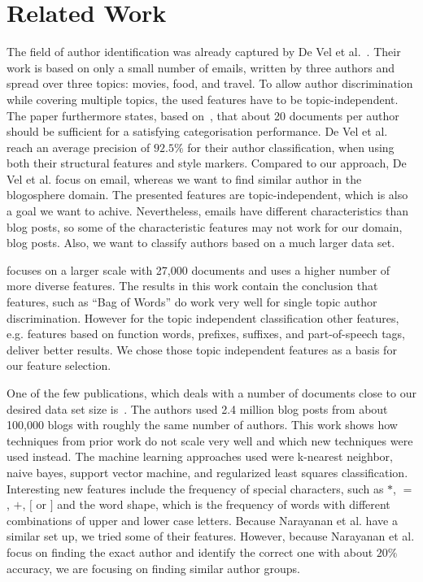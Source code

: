 
\section{Related Work}
\label{sec:related}

The field of author identification was already captured by De Vel et al.~\cite{de2001mining}.
Their work is based on only a small number of emails, written by three authors and spread over three topics: movies, food, and travel.
To allow author discrimination while covering multiple topics, the used features have to be topic-independent.
The paper furthermore states, based on~\cite{corney2001identifying}, that about 20 documents per author should be sufficient for a satisfying categorisation performance.
De Vel et al. reach an average precision of $92.5\%$ for their author classification, when using both their structural features and style markers.
Compared to our approach, De Vel et al. focus on email, whereas we want to find similar author in the blogosphere domain.
The presented features are topic-independent, which is also a goal we want to achive.
Nevertheless, emails have different characteristics than blog posts, so some of the characteristic features may not work for our domain, blog posts.
Also, we want to classify authors based on a much larger data set.


\cite{madigan2005author} focuses on a larger scale with 27,000 documents and uses a higher number of more diverse features.
The results in this work contain the conclusion that features, such as ``Bag of Words'' do work very well for single topic author discrimination.
However for the topic independent classification other features, e.g. features based on function words, prefixes, suffixes, and part-of-speech tags, deliver better results.
We chose those topic independent features as a basis for our feature selection.


One of the few publications, which deals with a number of documents close to our desired data set size is~\cite{narayanan2012feasibility}.
The authors used 2.4 million blog posts from about 100,000 blogs with roughly the same number of authors.
This work shows how techniques from prior work do not scale very well and which new techniques were used instead.
The machine learning approaches used were k-nearest neighbor, naive bayes, support vector machine, and regularized least squares classification.
Interesting new features include the frequency of special characters, such as $*$, $=$, $+$, $[$ or $]$ and the word shape, which is the frequency of words with different combinations of upper and lower case letters.
Because Narayanan et al. have a similar set up, we tried some of their features.
However, because Narayanan et al. focus on finding the exact author and identify the correct one with about $20\%$ accuracy, we are focusing on finding similar author groups.


